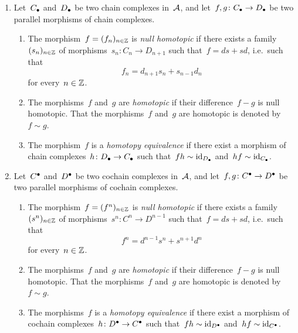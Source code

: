 \begin{definition}
  \leavevmode
  \begin{enumerate}
    \item 
      Let~$C_\bullet$ and~$D_\bullet$ be two chain complexes in~$\mathcal{A}$, and let~$f, g \colon C_\bullet \to D_\bullet$ be two parallel morphisms of chain complexes.
      \begin{enumerate}
        \item
          The morphism~$f = (f_n)_{n \in \mathbb{Z}}$ is \emph{null homotopic} if there exists a family~$(s_n)_{n \in \mathbb{Z}}$ of morphisms~$s_n \colon C_n \to D_{n+1}$ such that~$f = ds + sd$, i.e.\ such that
          \[
                f_n
            =  d_{n+1} s_n + s_{n-1} d_n
          \]
            for every~$n \in \mathbb{Z}$.
        \item
          The morphisms~$f$ and~$g$ are \emph{homotopic} if their difference~$f - g$ is null homotopic.
          That the morphisms~$f$ and~$g$ are homotopic is denoted by~$f \sim g$.
        \item
          The morphism~$f$ is a \emph{homotopy equivalence} if there exist a morphism of chain complexes~$h \colon D_\bullet \to C_\bullet$ such that~$f h \sim \operatorname{id}_{D_\bullet}$ and~$h f \sim \operatorname{id}_{C_\bullet}$.
      \end{enumerate}
    \item
      Let~$C^\bullet$ and~$D^\bullet$ be two cochain complexes in~$\mathcal{A}$, and let~$f, g \colon C^\bullet \to D^\bullet$ be two parallel morphisms of cochain complexes.
      \begin{enumerate}
        \item
          The morphism~$f = (f^n)_{n \in \mathbb{Z}}$ is \emph{null homotopic} if there exists a family~$(s^n)_{n \in \mathbb{Z}}$ of morphisms~$s^n \colon C^n \to D^{n-1}$ such that~$f = ds + sd$, i.e.\ such that
          \[
              f^n
            = d^{n-1} s^n + s^{n+1} d^n
          \]
          for every~$n \in \mathbb{Z}$.
        \item
          The morphisms~$f$ and~$g$ are \emph{homotopic} if their difference~$f - g$ is null homotopic.
          That the morphisms~$f$ and~$g$ are homotopic is denoted by~$f \sim g$.
        \item
          The morphisms~$f$ is a \emph{homotopy equivalence} if there exist a morphism of cochain complexes~$h \colon D^\bullet \to C^\bullet$ such that~$f h \sim \operatorname{id}_{D^\bullet}$ and~$h f \sim \operatorname{id}_{C^\bullet}$.
      \end{enumerate}
  \end{enumerate}
\end{definition}



